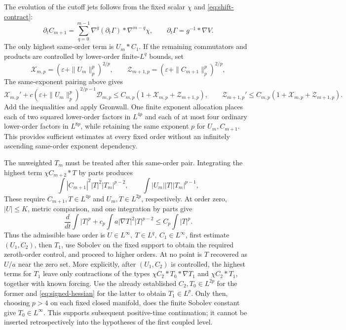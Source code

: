 \documentclass[a4paper,11pt]{article}
\numberwithin{equation}{section}
\theoremstyle{definition}
\begin{document}
The evolution of the cutoff jets follows from the fixed scalar $\chi$ and \eqref{eq:shift-contract}:
\[
\partial_tC_{m+1}
=\sum_{q=0}^{m-1}\nabla^q(\partial_t\Gamma)*\nabla^{m-q}\chi,
\qquad \partial_t\Gamma=g^{-1}*\nabla V.
\]
The only highest same-order term is $U_m*C_1$. If the remaining commutators and products are controlled by lower-order finite-$L^q$ bounds, set
\[
\mathcal X_{m,p}=(\varepsilon+\|U_m\|_p^p)^{2/p},\qquad
\mathcal Z_{m+1,p}=(\varepsilon+\|C_{m+1}\|_p^p)^{2/p},
\]
The same-exponent pairing above gives
\[
\mathcal X_{m,p}'+c(\varepsilon+\|U_m\|_p^p)^{2/p-1}\mathcal D_{m,p}
\le C_{m,p}(1+\mathcal X_{m,p}+\mathcal Z_{m+1,p}),\qquad
\mathcal Z_{m+1,p}'\le C_{m,p}(1+\mathcal X_{m,p}+\mathcal Z_{m+1,p}).
\]
Add the inequalities and apply Gronwall. One finite exponent allocation places each of two squared lower-order factors in $L^{4p}$ and each of at most four ordinary lower-order factors in $L^{8p}$, while retaining the same exponent $p$ for $U_m,C_{m+1}$. This provides sufficient estimates at every fixed order without an infinitely ascending same-order exponent dependency.

The unweighted $T_m$ must be treated after this same-order pair. Integrating the highest term
$\chi C_{m+2}*T$ by parts produces
\[
\int|C_{m+1}|^2|T|^2|T_m|^{p-2},\qquad
\int|U_m||T||T_m|^{p-1},
\]
These require $C_{m+1},T\in L^{4p}$ and $U_m,T\in L^{2p}$, respectively.
At order zero, $|U|\le K$, metric comparison, and one integration by parts give
\[
\frac d{dt}\int|T|^p+c_p\int a|\nabla T|^2|T|^{p-2}
\le C_p\int|T|^p.
\]
Thus the admissible base order is
$U\in L^\infty,\ T\in L^q,\ C_1\in L^\infty$,
first estimate $(U_1,C_2)$, then $T_1$, use Sobolev on the fixed support to obtain the required zeroth-order control, and proceed to higher orders.
At no point is $T$ recovered as $U/a$ near the zero set.
More explicitly, after $(U_1,C_2)$ is controlled, the highest terms for $T_1$ leave only contractions of the types
$\chi C_2*T_0*\nabla T_1$ and $\chi C_2*T_1$, together with known forcing.
Use the already established $C_2,T_0\in L^{2p}$ for the former and
\eqref{eq:signed-hessian} for the latter to obtain $T_1\in L^p$.
Only then, choosing $p>4$ on each fixed closed manifold, does the finite Sobolev constant give
$T_0\in L^\infty$. This supports subsequent positive-time continuation; it cannot be inserted retrospectively into the hypotheses of the first coupled level.
\end{document}
